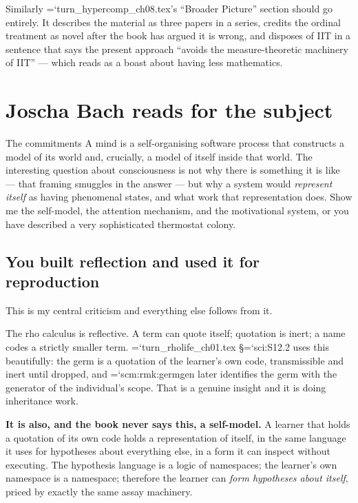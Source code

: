 \documentclass[11pt,letterpaper]{article}
\newcommand{\loc}[1]{{\small\ttfamily\color{accent}\hyphenchar\font=`\-\relax #1}}
\newcommand{\fnd}[1]{\textbf{\color{warn}#1}}
\begin{document}
Similarly \loc{turn\_hypercomp\_ch08.tex}'s ``Broader Picture'' section
should go entirely. It describes the material as three papers in a
series, credits the ordinal treatment as novel after the book has
argued it is wrong, and disposes of IIT in a sentence that says the
present approach ``avoids the measure-theoretic machinery of IIT'' ---
which reads as a boast about having less mathematics.

\section{Joscha Bach reads for the subject}
\label{sec:bach}

\begin{voice}{The commitments}
A mind is a self-organising software process that constructs a model
of its world and, crucially, a model of itself inside that world. The
interesting question about consciousness is not why there is something
it is like --- that framing smuggles in the answer --- but why a system
would \emph{represent itself} as having phenomenal states, and what
work that representation does. Show me the self-model, the attention
mechanism, and the motivational system, or you have described a very
sophisticated thermostat colony.
\end{voice}

\subsection*{You built reflection and used it for reproduction}

This is my central criticism and everything else follows from it.

The rho calculus is reflective. A term can quote itself; quotation is
inert; a name codes a strictly smaller term. \loc{turn\_rholife\_ch01.tex}
\S\loc{sci:S12.2} uses this beautifully: the germ is a quotation of the
learner's own code, transmissible and inert until dropped, and
\loc{scm:rmk:germgen} later identifies the germ with the generator of
the individual's scope. That is a genuine insight and it is doing
inheritance work.

\fnd{It is also, and the book never says this, a self-model.} A learner
that holds a quotation of its own code holds a representation of
itself, in the same language it uses for hypotheses about everything
else, in a form it can inspect without executing. The hypothesis
language is a logic of namespaces; the learner's own namespace is a
namespace; therefore the learner can \emph{form hypotheses about
itself}, priced by exactly the same assay machinery.
\end{document}
